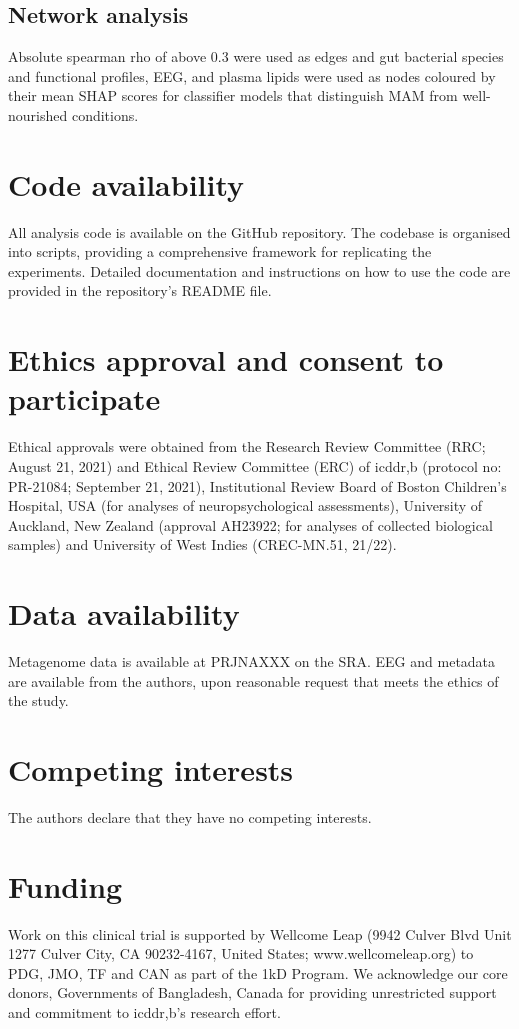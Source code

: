 \documentclass{article}
\begin{document}
\subsection*{Network analysis}
Absolute spearman rho of above 0.3 were used as edges and gut bacterial species and functional profiles, EEG, and plasma lipids were used as nodes coloured by their mean SHAP scores for classifier models that distinguish \gls{MAM} from well-nourished conditions.

\section*{Code availability}
All analysis code is available on the GitHub repository.
The codebase is organised into scripts, providing a comprehensive framework for replicating the experiments.
Detailed documentation and instructions on how to use the code are provided in the repository's README file.

\section*{Ethics approval and consent to participate}
Ethical approvals were obtained from the Research Review Committee (RRC; August 21, 2021) and Ethical Review Committee (ERC) of icddr,b (protocol no: PR-21084; September 21, 2021), Institutional Review Board of Boston Children’s Hospital, USA (for analyses of neuropsychological assessments), University of Auckland, New Zealand (approval AH23922; for analyses of collected biological samples) and University of West Indies (CREC-MN.51, 21/22).

\section*{Data availability}
Metagenome data is available at PRJNAXXX on the SRA. 
EEG and metadata are available from the authors, upon reasonable request that meets the ethics of the study.

\section*{Competing interests}
The authors declare that they have no competing interests.

\section*{Funding}
Work on this clinical trial is supported by Wellcome Leap (9942 Culver Blvd Unit 1277 Culver City, CA 90232-4167, United States; www.wellcomeleap.org) to PDG, JMO, TF and CAN as part of the 1kD Program.
We acknowledge our core donors, Governments of Bangladesh, Canada for providing unrestricted support and commitment to icddr,b's research effort.
\end{document}
